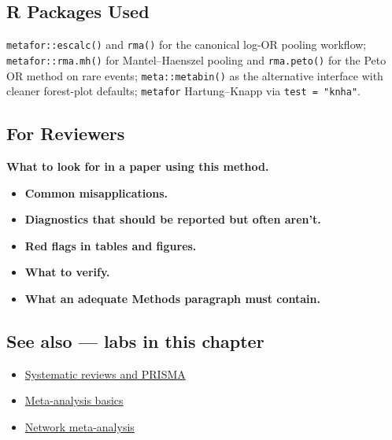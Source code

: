 \documentclass[
]{article}
\providecommand{\tightlist}{%
  \setlength{\itemsep}{0pt}\setlength{\parskip}{0pt}}
\begin{document}
\subsection{R Packages Used}\label{r-packages-used}

\texttt{metafor::escalc()} and \texttt{rma()} for the canonical log-OR
pooling workflow; \texttt{metafor::rma.mh()} for Mantel--Haenszel
pooling and \texttt{rma.peto()} for the Peto OR method on rare events;
\texttt{meta::metabin()} as the alternative interface with cleaner
forest-plot defaults; \texttt{metafor} Hartung--Knapp via
\texttt{test\ =\ "knha"}.

\subsection{For Reviewers}\label{for-reviewers}

\textbf{What to look for in a paper using this method.}

\begin{itemize}
\tightlist
\item
  \textbf{Common misapplications.}
\item
  \textbf{Diagnostics that should be reported but often aren't.}
\item
  \textbf{Red flags in tables and figures.}
\item
  \textbf{What to verify.}
\item
  \textbf{What an adequate Methods paragraph must contain.}
\end{itemize}

\subsection{See also --- labs in this
chapter}\label{see-also-labs-in-this-chapter}

\begin{itemize}
\tightlist
\item
  \href{labs/lab-systematic-reviews-and-prisma.Rmd}{Systematic reviews
  and PRISMA}
\item
  \href{labs/lab-meta-analysis-basics.Rmd}{Meta-analysis basics}
\item
  \href{labs/lab-network-meta-analysis.Rmd}{Network meta-analysis}
\end{itemize}
\end{document}
